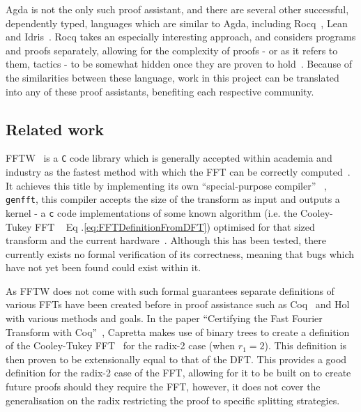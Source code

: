 Agda is not the only such proof assistant, and there are several other
successful, dependently typed, languages which are similar to Agda, including
Rocq~\cite{Barras1999}, Lean~\cite{Lean2021} and Idris~\cite{Idris2011}.
Rocq takes an especially interesting approach, and considers programs and proofs
separately, allowing for the complexity of proofs - or as it refers to them, 
tactics - to be somewhat hidden once they are proven to hold~\cite{Barras1999}.
Because of the similarities between these language, work in this project can
be translated into any of these proof assistants, benefiting each respective
community.

\subsection{Related work}
FFTW~\cite{Frigo2005} is a \verb|C| code library which is generally accepted 
within academia and industry as the fastest method with which the FFT can be 
correctly computed~\cite{Frigo1999}.
It achieves this title by implementing its own ``special-purpose compiler''
~\cite{Frigo1999}, \verb|genfft|, this compiler accepts the size of the 
transform as input and outputs a kernel - a \verb|c| code implementations of 
some known algorithm (i.e. the Cooley-Tukey FFT ~\cite{Cooley1965} Eq 
.\ref{eq:FFTDefinitionFromDFT}) optimised for that sized transform and the 
current hardware~\cite{Frigo1999}.
Although this has been tested, there currently exists no formal verification of
its correctness, meaning that bugs which have not yet been found could exist
within it.


As FFTW does not come with such formal guarantees 
separate definitions of various FFTs have been created before in proof assistance such as Coq~\cite{Barras1999} and Hol~\cite{Gordon1993} with various methods and goals. In the paper ``Certifying the Fast Fourier Transform with Coq''~\cite{Capretta2001}, Capretta makes use of binary trees to create a definition of the Cooley-Tukey FFT~\cite{Cooley1965} for the radix-2 case (when $r_1=2$).
This definition is then proven to be extensionally equal to that of the DFT.
This provides a good definition for the radix-2 case of the FFT, allowing for it to be built on to create future proofs should they require the FFT, however, it does not cover the generalisation on the radix restricting the proof to specific splitting strategies.

